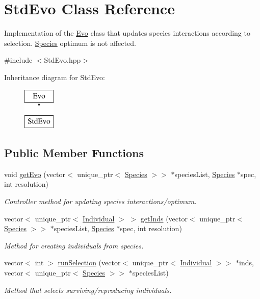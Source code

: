 \hypertarget{classStdEvo}{}\section{Std\+Evo Class Reference}
\label{classStdEvo}


Implementation of the \hyperlink{classEvo}{Evo} class that updates species interactions according to selection. \hyperlink{classSpecies}{Species} optimum is not affected.  




{\ttfamily \#include $<$Std\+Evo.\+hpp$>$}

Inheritance diagram for Std\+Evo\+:\begin{figure}[H]
\begin{center}
\leavevmode
\includegraphics[height=2.000000cm]{classStdEvo}
\end{center}
\end{figure}
\subsection*{Public Member Functions}
\begin{DoxyCompactItemize}
\item 
void \hyperlink{classStdEvo_aa2b036f5e38510eca6cdbd60fc2bb23f}{get\+Evo} (vector$<$ unique\+\_\+ptr$<$ \hyperlink{classSpecies}{Species} $>$$>$ $\ast$species\+List, \hyperlink{classSpecies}{Species} $\ast$spec, int resolution)
\begin{DoxyCompactList}\small\item\em Controller method for updating species interactions/optimum. \end{DoxyCompactList}\item 
vector$<$ unique\+\_\+ptr$<$ \hyperlink{classIndividual}{Individual} $>$ $>$ \hyperlink{classStdEvo_a40bd3beb0e6f36baee1b40db279fd9b4}{get\+Inds} (vector$<$ unique\+\_\+ptr$<$ \hyperlink{classSpecies}{Species} $>$$>$ $\ast$species\+List, \hyperlink{classSpecies}{Species} $\ast$spec, int resolution)
\begin{DoxyCompactList}\small\item\em Method for creating individuals from species. \end{DoxyCompactList}\item 
vector$<$ int $>$ \hyperlink{classStdEvo_a6d4c64918a01dd00ad5185796b67e219}{run\+Selection} (vector$<$ unique\+\_\+ptr$<$ \hyperlink{classIndividual}{Individual} $>$$>$ $\ast$inds, vector$<$ unique\+\_\+ptr$<$ \hyperlink{classSpecies}{Species} $>$$>$ $\ast$species\+List)
\begin{DoxyCompactList}\small\item\em Method that selects surviving/reproducing individuals. \end{DoxyCompactList}\end{DoxyCompactItemize}
